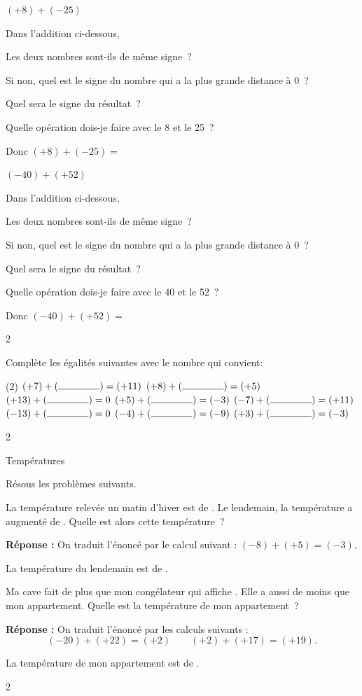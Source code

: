 \documentclass[a4paper,11pt]{report}
\begin{document}
\begin{exop}
{\begin{tasks}[after-item-skip=0.2em]
\task $(+8)+(-25)$

Dans l'addition ci-dessous,

Les deux nombres sont-ils de même signe~? \hrulefill

Si non, quel est le signe du nombre qui a la plus grande distance à 0~? \hrulefill

Quel sera le signe du résultat~? \hrulefill

Quelle opération dois-je faire avec le 8 et le 25~? \hrulefill

Donc $(+8)+(-25)=$ \hrulefill

\task $(-40)+(+52)$

Dans l'addition ci-dessous,

Les deux nombres sont-ils de même signe~? \hrulefill

Si non, quel est le signe du nombre qui a la plus grande distance à 0~? \hrulefill

Quel sera le signe du résultat~?

Quelle opération dois-je faire avec le 40 et le 52~? \hrulefill

Donc $(-40)+(+52)=$ \hrulefill
\end{tasks}
}{2}
\end{exop}

\begin{exop}{
Complète les égalités suivantes avec le nombre qui convient:
\begin{tasks}(2)
\task $(+7)+(\ligne{1.5})=(+11)$
\task $(+8)+(\ligne{1.5})=(+5)$
\task $(+13)+(\ligne{1.5})=0$
\task $(+5)+(\ligne{1.5})=(-3)$
\task $(-7)+(\ligne{1.5})=(+11)$
\task $(-13)+(\ligne{1.5})=0$
\task $(-4)+(\ligne{1.5})=(-9)$
\task $(+3)+(\ligne{1.5})=(-3)$
\end{tasks}
}{2}\end{exop}

\begin{resolu}
{Températures}{Résous les problèmes suivants.
\begin{tasks}
	\task La température relevée un matin d'hiver est de . Le lendemain, la température a augmenté de . Quelle est alors cette température~?

{\bf Réponse :} On traduit l'énoncé par le calcul suivant : $(-8)+(+5)=(-3).$ 

La température du lendemain est de .

\task Ma cave fait  de plus que mon congélateur qui affiche . Elle a aussi  de moins que mon appartement. Quelle est la température de mon appartement~?

{\bf Réponse :} On traduit l'énoncé par les calculs suivants : $$(-20)+(+22)=(+2) \qquad (+2)+(+17)= (+19).$$

La température de mon appartement est de .
\end{tasks}

}{2}
\end{resolu}
\end{document}
